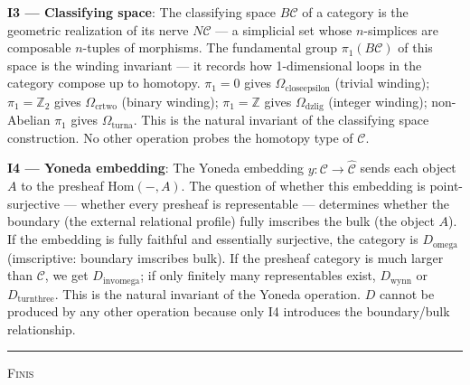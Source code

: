 \documentclass[12pt,a4paper]{article}
\begin{document}
\textbf{I3 --- Classifying space}: The classifying space $B\mathcal{C}$ of a category is the geometric realization of its nerve $N\mathcal{C}$ --- a simplicial set whose $n$-simplices are composable $n$-tuples of morphisms. The fundamental group $\pi_1(B\mathcal{C})$ of this space is the winding invariant --- it records how 1-dimensional loops in the category compose up to homotopy. $\pi_1 = 0$ gives $\Omega_{\text{closeepsilon}}$ (trivial winding); $\pi_1 = \mathbb{Z}_2$ gives $\Omega_{\text{crtwo}}$ (binary winding); $\pi_1 = \mathbb{Z}$ gives $\Omega_{\text{dzlig}}$ (integer winding); non-Abelian $\pi_1$ gives $\Omega_{\text{turna}}$. This is the natural invariant of the classifying space construction. No other operation probes the homotopy type of $\mathcal{C}$.

\textbf{I4 --- Yoneda embedding}: The Yoneda embedding $y: \mathcal{C} \to \hat{\mathcal{C}}$ sends each object $A$ to the presheaf $\text{Hom}(-,A)$. The question of whether this embedding is point-surjective --- whether every presheaf is representable --- determines whether the boundary (the external relational profile) fully imscribes the bulk (the object $A$). If the embedding is fully faithful and essentially surjective, the category is $D_{\text{omega}}$ (imscriptive: boundary imscribes bulk). If the presheaf category is much larger than $\mathcal{C}$, we get $D_{\text{invomega}}$; if only finitely many representables exist, $D_{\text{wynn}}$ or $D_{\text{turnthree}}$. This is the natural invariant of the Yoneda operation. $D$ cannot be produced by any other operation because only I4 introduces the boundary/bulk relationship.


\vspace{4em}
\begin{center}
    \rule{0.5\textwidth}{0.4pt}
    \textsc{Finis}
\end{center}
\end{document}

